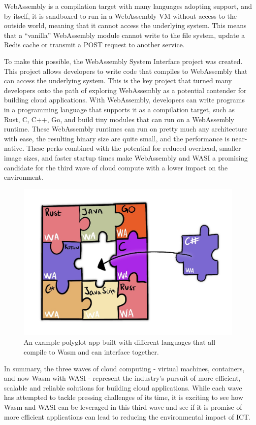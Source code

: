 \documentclass[
  table]{report}
\begin{document}
WebAssembly is a compilation target with many languages adopting
support, and by itself, it is sandboxed to run in a WebAssembly \ac{VM}
without access to the outside world, meaning that it cannot access the
underlying system. This means that a ``vanilla'' WebAssembly module
cannot write to the file system, update a Redis cache or transmit a POST
request to another service.

To make this possible, the WebAssembly System Interface project was
created. This project allows developers to write code that compiles to
WebAssembly that can access the underlying system. This is the key
project that turned many developers onto the path of exploring
WebAssembly as a potential contender for building cloud applications.
With WebAssembly, developers can write programs in a programming
language that supports it as a compilation target, such as Rust, C, C++,
Go, and build tiny modules that can run on a WebAssembly runtime. These
WebAssembly runtimes can run on pretty much any architecture with ease,
the resulting binary size are quite small, and the performance is
near-native. These perks combined with the potential for reduced
overhead, smaller image sizes, and faster startup times make WebAssembly
and \ac{WASI} a promising candidate for the third wave of cloud compute
with a lower impact on the environment.

\begin{figure}[H]
\centering
  \includegraphics[width=0.8\columnwidth]{assets/wasm-wave.jpg}
  \caption{An example polyglot app built with different languages that all
compile to \ac{Wasm} and can interface together.}
  \label{fig:wasm-wave}
\end{figure}

In summary, the three waves of cloud computing - virtual machines,
containers, and now \ac{Wasm} with \ac{WASI} - represent the industry's
pursuit of more efficient, scalable and reliable solutions for building
cloud applications. While each wave has attempted to tackle pressing
challenges of its time, it is exciting to see how \ac{Wasm} and
\ac{WASI} can be leveraged in this third wave and see if it is promise
of more efficient applications can lead to reducing the environmental
impact of ICT.
\end{document}
